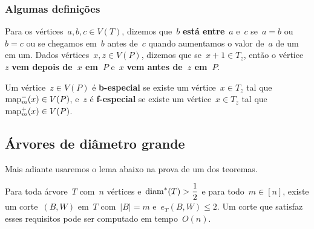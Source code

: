 	\subsubsection*{Algumas definições}
	Para os vértices~${a,b,c\in V(T)}$, dizemos que~$b$
	\textbf{está entre}~$a$ e~$c$ se~${a=b}$ ou~${b=c}$ 
	ou se chegamos em~$b$ antes
	de~$c$ quando aumentamos o valor de~$a$  
	de um em um.
	Dados vértices~${x,z\in V(P)}$, dizemos que 
	se~${x+1\in T_z}$, então o
	vértice~$z$ \textbf{vem depois de~$x$ em~$P$} 
	e~$x$ \textbf{vem antes de~$z$ em~$P$}.


	Um vértice~${z\in V(P)}$ é \textbf{b-especial}
	se existe um vértice~${x\in T_z}$ tal 
	que~${\mathrm{map}^{-}_m(x)\in V(P)}$, e~$z$ é
	\textbf{f-especial} se existe um vértice~${x\in T_z}$
	tal que~${\mathrm{map}^{+}_m(x)\in V(P)}$.

	\bigskip
	




	\subsection{Árvores de diâmetro grande}

	Mais adiante usaremos  	o lema abaixo na prova de 
	um dos teoremas.

	\begin{lem}
	\label{lema:caminhoLongo}
		Para toda árvore~$T$ com~$n$ 
		vértices e~${\mathrm{diam}^*(T)>\dfrac{1}{2}}$
		e para todo~${m\in[n]}$, existe um corte~$(B,W)$ em~$T$
		com~${|B|=m}$ e~${e_T(B,W)\le 2}$. Um corte que satisfaz esses
		requisitos pode ser computado em tempo~$O(n)$.
	\end{lem}

	\medskip
	\medskip

